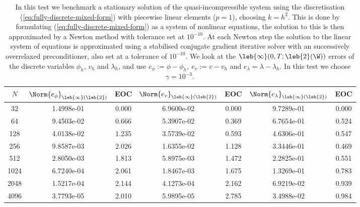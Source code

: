 \documentclass[final]{amsart}
\numberwithin{equation}{section}
\begin{document}
\begin{table}
  \caption{\label{table:p1-gamma-10-3} In this test we benchmark a
    stationary solution of the quasi-incompressible system using the discretisation
    (\ref{eq:fully-discrete-mixed-form}) with piecewise linear elements ($p =
    1$), choosing $k = h^2$. This is done by formulating
    (\ref{eq:fully-discrete-mixed-form}) as a system of nonlinear equations, the
    solution to this is then approximated by a Newton method with
    tolerance set at $10^{-10}$. At each Newton step the solution to
    the linear system of equations is approximated using a stabilised
    conjugate gradient iterative solver with an successively
    overrelaxed preconditioner, also set at a tolerance of
    $10^{-10}$. We look at the $\leb{\infty}(0,T; \leb{2}(\W))$ errors
    of the discrete variables {$\phi_h,\, v_h$ and $\lambda_h$}, and use $e_\phi :=
    \phi - \phi_h,\ e_v := v - v_h$ {and $e_\lambda= \lambda-\lambda_h$}. In this test we choose
    $\gamma = 10^{-3}$.}
  \begin{center}
    
\begin{tabular}{c|c|c|c|c|c|c}
$N$ & $\Norm{e_\phi}_{\leb{\infty}(\leb{2})}$ & EOC & $\Norm{e_v}_{\leb{\infty}(\leb{2})}$ & EOC & $\Norm{e_\lambda}_{\leb{\infty}(\leb{2})}$ & EOC \\
\hline
32 & 1.4998e-01 & 0.000 & 6.9600e-02 & 0.000 & 9.7289e-01 & 0.000 \\
64 & 9.4503e-02 & 0.666 & 5.3907e-02 & 0.369 & 6.7654e-01 & 0.524 \\
128 & 4.0138e-02 & 1.235 & 3.5739e-02 & 0.593 & 4.6306e-01 & 0.547 \\
256 & 9.8587e-03 & 2.026 & 1.6355e-02 & 1.128 & 3.3446e-01 & 0.469 \\
512 & 2.8050e-03 & 1.813 & 5.8975e-03 & 1.472 & 2.2825e-01 & 0.551 \\
1024 & 6.7240e-04 & 2.061 & 1.8467e-03 & 1.675 & 1.3269e-01 & 0.783 \\
2048 & 1.5217e-04 & 2.144 & 4.1273e-04 & 2.162 & 6.9219e-02 & 0.939 \\
4096 & 3.7793e-05 & 2.010 & 5.9895e-05 & 2.785 & 3.4988e-02 & 0.984 \\
\end{tabular}
  \end{center}
\end{table}
\end{document}
